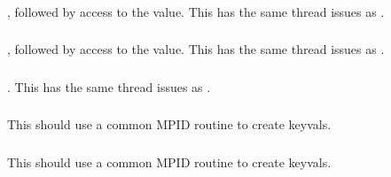 \documentclass{article}
\begin{document}
\subsubsection{}
\begin{adi3}, followed by access to the value.
This has the same thread issues as .
\end{adi3}

\subsubsection{}
\begin{adi3}, followed by access to the value.
This has the same thread issues as .
\end{adi3}

\subsubsection{}
\begin{adi3}.
This has the same thread issues as .
\end{adi3}

\subsubsection{}
This should use a common MPID routine to create keyvals.  

\subsubsection{}

\subsubsection{}
This should use a common MPID routine to create keyvals.  
\end{document}
